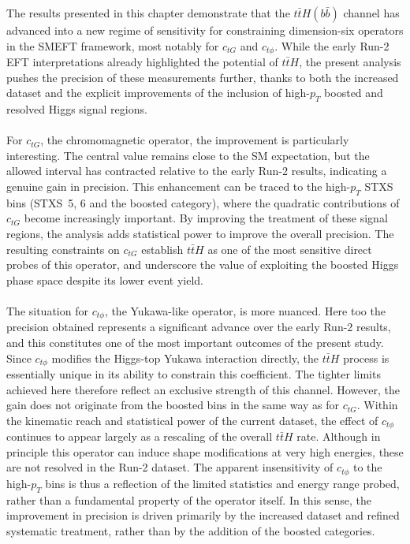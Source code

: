 The results presented in this chapter demonstrate that the $t\bar{t}H(b\bar{b})$ channel has advanced into a new regime of sensitivity for constraining dimension-six operators in the SMEFT framework, most notably for $c_{tG}$ and $c_{t\phi}$. While the early Run-2 EFT interpretations already highlighted the potential of $t\bar{t}H$, the present analysis pushes the precision of these measurements further, thanks to both the increased dataset and the explicit improvements of the inclusion of high-$p_T$ boosted and resolved Higgs signal regions.\\
\\
For $c_{tG}$, the chromomagnetic operator, the improvement is particularly interesting. The central value remains close to the SM expectation, but the allowed interval has contracted relative to the early Run-2 results, indicating a genuine gain in precision. This enhancement can be traced to the high-$p_{T}$ STXS bins (STXS~5, 6 and the boosted category), where the quadratic contributions of $c_{tG}$ become increasingly important. By improving the treatment of these signal regions, the analysis adds statistical power to improve the overall precision. The resulting constraints on $c_{tG}$ establish $t\bar{t}H$ as one of the most sensitive direct probes of this operator, and underscore the value of exploiting the boosted Higgs phase space despite its lower event yield.\\
\\
The situation for $c_{t\phi}$, the Yukawa-like operator, is more nuanced. Here too the precision obtained represents a significant advance over the early Run-2 results, and this constitutes one of the most important outcomes of the present study. Since $c_{t\phi}$ modifies the Higgs-top Yukawa interaction directly, the $t\bar{t}H$ process is essentially unique in its ability to constrain this coefficient. The tighter limits achieved here therefore reflect an exclusive strength of this channel. However, the gain does not originate from the boosted bins in the same way as for $c_{tG}$. Within the kinematic reach and statistical power of the current dataset, the effect of $c_{t\phi}$ continues to appear largely as a rescaling of the overall $t\bar{t}H$ rate. Although in principle this operator can induce shape modifications at very high energies, these are not resolved in the Run-2 dataset. The apparent insensitivity of $c_{t\phi}$ to the high-$p_{T}$ bins is thus a reflection of the limited statistics and energy range probed, rather than a fundamental property of the operator itself. In this sense, the improvement in precision is driven primarily by the increased dataset and refined systematic treatment, rather than by the addition of the boosted categories.\\
